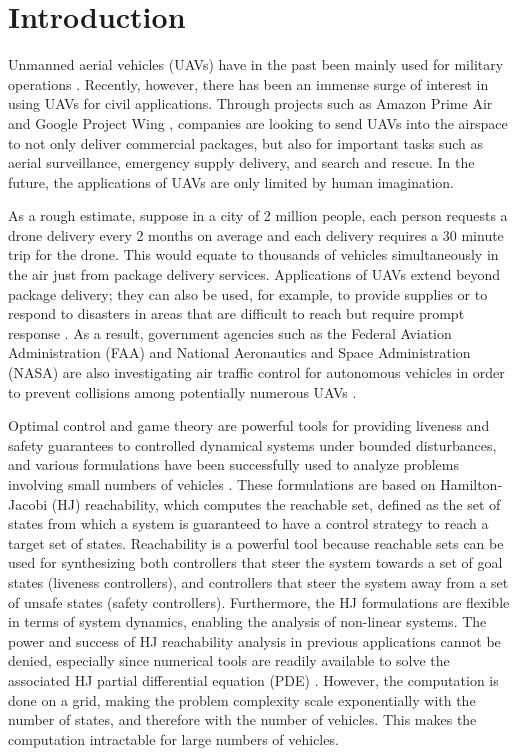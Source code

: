 \section{Introduction}
Unmanned aerial vehicles (UAVs) have in the past been mainly used for military operations \cite{Tice91}. Recently, however, there has been an immense surge of interest in using UAVs for civil applications. Through projects such as Amazon Prime Air \cite{PrimeAir} and Google Project Wing \cite{ProjectWing}, companies are looking to send UAVs into the airspace to not only deliver commercial packages, but also for important tasks such as aerial surveillance, emergency supply delivery, and search and rescue. In the future, the applications of UAVs are only limited by human imagination. 

As a rough estimate, suppose in a city of 2 million people, each person requests a drone delivery every 2 months on average and each delivery requires a 30 minute trip for the drone. This would equate to thousands of vehicles simultaneously in the air just from package delivery services. Applications of UAVs extend beyond package delivery; they can also be used, for example, to provide supplies or to respond to disasters in areas that are difficult to reach but require prompt response \cite{Debusk10,Tornado16}. As a result, government agencies such as the Federal Aviation Administration (FAA) and National Aeronautics and Space Administration (NASA) are also investigating air traffic control for autonomous vehicles in order to prevent collisions among potentially numerous UAVs \cite{FAA13, NASA16}. 

Optimal control and game theory are powerful tools for providing liveness and safety guarantees to controlled dynamical systems under bounded disturbances, and various formulations \cite{Bokanowski10,Mitchell05,Barron89} have been successfully used to analyze problems involving small numbers of vehicles \cite{Fisac15,Chen14,Ding08}. These formulations are based on Hamilton-Jacobi (HJ) reachability, which computes the reachable set, defined as the set of states from which a system is guaranteed to have a control strategy to reach a target set of states. Reachability is a powerful tool because reachable sets can be used for synthesizing both controllers that steer the system towards a set of goal states (liveness controllers), and controllers that steer the system away from a set of unsafe states (safety controllers). Furthermore, the HJ formulations are flexible in terms of system dynamics, enabling the analysis of non-linear systems. The power and success of HJ reachability analysis in previous applications cannot be denied, especially since numerical tools are readily available to solve the associated HJ partial differential equation (PDE) \cite{LSToolbox,Osher02,Sethian96}. However, the computation is done on a grid, making the problem complexity scale exponentially with the number of states, and therefore with the number of vehicles. This makes the computation intractable for large numbers of vehicles. 

